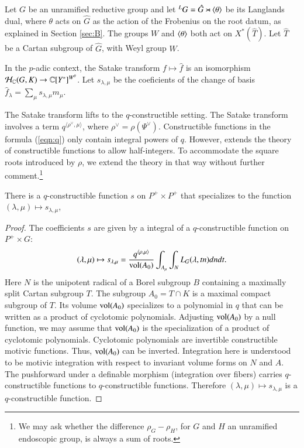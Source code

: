 Let $G$ be an unramified reductive group and let ${}^LG = \hat
G\rtimes \langle{\theta}\rangle$ be its Langlands dual, where $\theta$ acts on
$\hat G$ as the action of the Frobenius on the root datum, as
explained in Section \ref{sec:B}.  The groups $W$ and $\langle{\theta}\rangle$
both act on $X^*(\hat T)$.  Let $\hat T$ be a Cartan subgroup of $\hat
G$, with Weyl group $W$.

In the $p$-adic context, the Satake transform $f\mapsto \hat f$ is an
isomorphism $\mathcal H_{\mathbb{C}}(G,K)\to\mathbb{C}[Y^*]^{W^\theta}$.  Let
$s_{\lambda,\mu}$ be the coeficients of the change of basis $\hat
f_\lambda = \sum_\mu s_{\lambda,\mu} m_\mu$.

The Satake transform lifts to the $q$-constructible setting.  The
Satake transform involves a term $q^{\langle\rho^\vee,\mu\rangle}$,
where $\rho^\vee = \rho(\Psi^\vee)$.  Constructible functions in the
formula (\ref{eqn:q}) only contain integral powers of $q$.  However,
\cite[\S B.3.1]{cluckers2011local} extends the theory of constructible
functions to allow half-integers.  To accommodate the square roots
introduced by $\rho$, we extend the theory in that way without further
comment.\footnote{We may ask whether the difference $\rho_G - \rho_H$,
  for $G$ and $H$ an unramified endoscopic group, is always a sum of
  roots.}

\begin{lemma}\label{lemma:satake} 
  There is a $q$-constructible function $s$ on $P^+\times P^+$ that
  specializes to the function $(\lambda,\mu)\mapsto s_{\lambda,\mu}$,
\end{lemma}

\begin{proof} 
  The coefficients $s$ are given by a integral of a $q$-constructible
  function on $P^+\times G$:
\begin{equation}\label{eqn:s}
(\lambda,\mu)\mapsto s_{\lambda,\mu}
=\frac{q^{\langle\rho,\mu\rangle}}{{\operatorname{vol}}(A_0)} 
\int_{A_\mu} \int_N L_G(\lambda,t n) dn dt.
\end{equation}
Here $N$ is the unipotent radical of a Borel subgroup $B$ containing a
maximally split Cartan subgroup $T$.  The subgroup $A_0 = T\cap K$ is
a maximal compact subgroup of $T$.  Its volume ${\operatorname{vol}}(A_0)$
specializes to a polynomial in $q$ that can be written as a product of
cyclotomic polynomials.  Adjusting ${\operatorname{vol}}(A_0)$ by a null function,
we may assume that ${\operatorname{vol}}(A_0)$ is the specialization of a product
of cyclotomic polynomials.  Cyclotomic polynomials are invertible
constructible motivic functions.  Thus, ${\operatorname{vol}}(A_0)$ can be
inverted.  Integration here is understood to be motivic integration
with respect to invariant volume forms on $N$ and $A$.  The
pushforward under a definable morphism (integration over fibers)
carries $q$-constructible functions to $q$-constructible functions.
Therefore $(\lambda,\mu)\mapsto s_{\lambda,\mu}$ is a
$q$-constructible function.
\end{proof}

